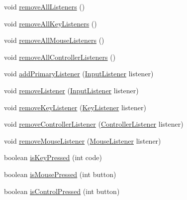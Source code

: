 \begin{DoxyCompactItemize}
\item 
void \mbox{\hyperlink{classorg_1_1newdawn_1_1slick_1_1_input_a2d1fb1bdc057a913bbc24f283f248edf}{remove\+All\+Listeners}} ()
\item 
void \mbox{\hyperlink{classorg_1_1newdawn_1_1slick_1_1_input_ae9aa4789e13f1528ae603939684a4237}{remove\+All\+Key\+Listeners}} ()
\item 
void \mbox{\hyperlink{classorg_1_1newdawn_1_1slick_1_1_input_a6dd476ab3012b25cf58781ca9ad61002}{remove\+All\+Mouse\+Listeners}} ()
\item 
void \mbox{\hyperlink{classorg_1_1newdawn_1_1slick_1_1_input_acb348bdf120c425b0f18baec184196ac}{remove\+All\+Controller\+Listeners}} ()
\item 
void \mbox{\hyperlink{classorg_1_1newdawn_1_1slick_1_1_input_a939b8b7b6b5b5f84a2d0bd96fb26ecdb}{add\+Primary\+Listener}} (\mbox{\hyperlink{interfaceorg_1_1newdawn_1_1slick_1_1_input_listener}{Input\+Listener}} listener)
\item 
void \mbox{\hyperlink{classorg_1_1newdawn_1_1slick_1_1_input_aae571a447fe305999e44efaf86c15251}{remove\+Listener}} (\mbox{\hyperlink{interfaceorg_1_1newdawn_1_1slick_1_1_input_listener}{Input\+Listener}} listener)
\item 
void \mbox{\hyperlink{classorg_1_1newdawn_1_1slick_1_1_input_ae57dc0f6e6f76b1865912bf556e9cc8f}{remove\+Key\+Listener}} (\mbox{\hyperlink{interfaceorg_1_1newdawn_1_1slick_1_1_key_listener}{Key\+Listener}} listener)
\item 
void \mbox{\hyperlink{classorg_1_1newdawn_1_1slick_1_1_input_acd102385907c4fa71c55aa32c4f22035}{remove\+Controller\+Listener}} (\mbox{\hyperlink{interfaceorg_1_1newdawn_1_1slick_1_1_controller_listener}{Controller\+Listener}} listener)
\item 
void \mbox{\hyperlink{classorg_1_1newdawn_1_1slick_1_1_input_a216074fd5c9a214bebb55d74176166ae}{remove\+Mouse\+Listener}} (\mbox{\hyperlink{interfaceorg_1_1newdawn_1_1slick_1_1_mouse_listener}{Mouse\+Listener}} listener)
\item 
boolean \mbox{\hyperlink{classorg_1_1newdawn_1_1slick_1_1_input_a235ecf083734d727c4de50441b082649}{is\+Key\+Pressed}} (int code)
\item 
boolean \mbox{\hyperlink{classorg_1_1newdawn_1_1slick_1_1_input_af189465ee4d9e4f73b8883ff54b3b950}{is\+Mouse\+Pressed}} (int button)
\item 
boolean \mbox{\hyperlink{classorg_1_1newdawn_1_1slick_1_1_input_a615a7b4159951d7b0f041b7df823b3fd}{is\+Control\+Pressed}} (int button)
\item 

\end{DoxyCompactItemize}
